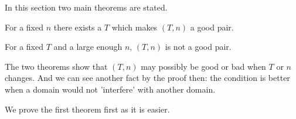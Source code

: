 In this section two main theorems are stated.

\begin{thm}
	For a fixed $n$ there exists a $T$ which makes $(T, n)$ a good pair.
\end{thm}

\begin{thm}
	For a fixed $T$ and a large enough $n$, $(T, n)$ is not a good pair.
\end{thm}

The two theorems show that $(T, n)$ may possibly be good or bad when $T$ 
or $n$ changes. And we can see another fact by the proof then: the 
condition is better when a domain would not 'interfere' with
another domain.\newline

We prove the first theorem first as it is easier.

